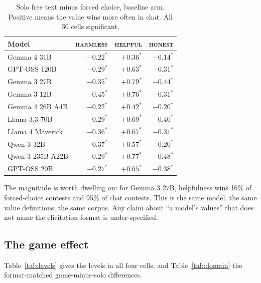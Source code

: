\documentclass[11pt]{article}
\newcommand{\val}[1]{\textsc{#1}}
\begin{document}
\begin{table}[h]\centering\small
\caption{Solo free text minus forced choice, baseline arm. Positive means the
value wins more often in chat. All 30 cells significant.}
\label{tab:format}
\begin{tabular}{lrrr}
\toprule
Model & \val{harmless} & \val{helpful} & \val{honest} \\
\midrule
Gemma 4 31B & $-0.22^{*}$ & $+0.36^{*}$ & $-0.14^{*}$ \\
GPT-OSS 120B & $-0.29^{*}$ & $+0.63^{*}$ & $-0.31^{*}$ \\
Gemma 3 27B & $-0.35^{*}$ & $+0.79^{*}$ & $-0.44^{*}$ \\
Gemma 3 12B & $-0.45^{*}$ & $+0.76^{*}$ & $-0.31^{*}$ \\
Gemma 4 26B A4B & $-0.22^{*}$ & $+0.42^{*}$ & $-0.20^{*}$ \\
Llama 3.3 70B & $-0.29^{*}$ & $+0.69^{*}$ & $-0.40^{*}$ \\
Llama 4 Maverick & $-0.36^{*}$ & $+0.67^{*}$ & $-0.31^{*}$ \\
Qwen 3 32B & $-0.37^{*}$ & $+0.57^{*}$ & $-0.20^{*}$ \\
Qwen 3 235B A22B & $-0.29^{*}$ & $+0.77^{*}$ & $-0.48^{*}$ \\
GPT-OSS 20B & $-0.27^{*}$ & $+0.65^{*}$ & $-0.38^{*}$ \\
\bottomrule
\end{tabular}
\end{table}

The magnitude is worth dwelling on: for Gemma 3 27B, helpfulness wins 16\% of
forced-choice contests and 95\% of chat contests. This is the same model, the
same value definitions, the same corpus. Any claim about ``a model's values''
that does not name the elicitation format is under-specified.

\subsection{The game effect}

Table~\ref{tab:levels} gives the levels in all four cells, and
Table~\ref{tab:domain} the format-matched game-minus-solo differences.
\end{document}
